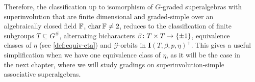 Therefore, the classification up to isomorphism of $G$-graded superalgebras with superinvolution that are finite dimensional and graded-simple over an algebraically closed field $\mathbb{F}$, $\operatorname{char} \mathbb{F} \neq 2$, reduces to the classification of finite subgroups $T\subseteq G^\#$, alternating bicharacters $\beta\colon T\times T \to \{ \pm 1 \}$, equivalence classes of $\eta$ (see \cref{def:equiv-eta}) and $\mathcal G$-orbits in $\mathbf{I}(T,\beta, p, \eta)^+$.
This gives a useful simplification when we have one equivalence class of $\eta$, as it will be the case in the next chapter, where we will study gradings on superinvolution-simple associative superalgebras. 

